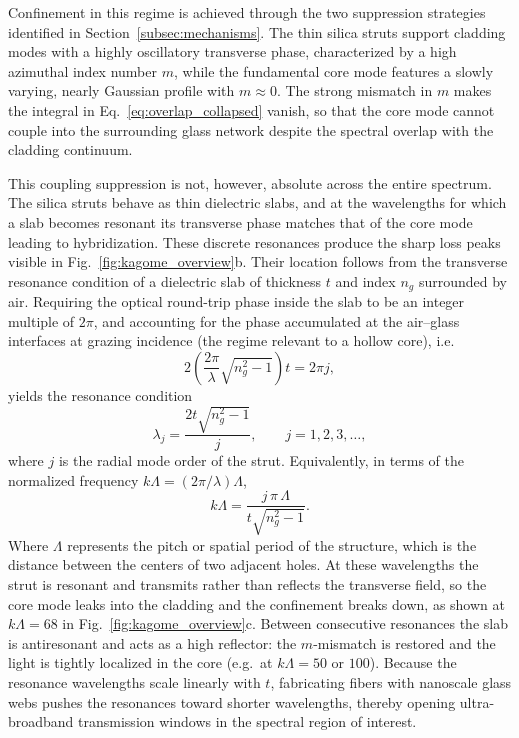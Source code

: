 Confinement in this regime is achieved through the two suppression strategies identified in Section~\ref{subsec:mechanisms}. The thin silica struts support cladding modes with a highly oscillatory transverse phase, characterized by a high azimuthal index number $m$, while the fundamental core mode features a slowly varying, nearly Gaussian profile with $m \approx 0$. The strong mismatch in $m$ makes the integral in Eq.~\ref{eq:overlap_collapsed} vanish, so that the core mode cannot couple into the surrounding glass network despite the spectral overlap with the cladding continuum.

This coupling suppression is not, however, absolute across the entire spectrum. The silica struts behave as thin dielectric slabs, and at the wavelengths for which a slab becomes resonant its transverse phase matches that of the core mode leading to hybridization. These discrete resonances produce the sharp loss peaks visible in Fig.~\ref{fig:kagome_overview}b. Their location follows from the transverse resonance condition of a dielectric slab of thickness $t$ and index $n_g$ surrounded by air. Requiring the optical round-trip phase inside the slab to be an integer multiple of $2\pi$, and accounting for the phase accumulated at the air--glass interfaces at grazing incidence (the regime relevant to a hollow core), i.e.
\begin{equation}
2\left(\frac{2\pi}{\lambda}\sqrt{n_g^2-1}\right)t = 2\pi j,
\end{equation}
yields the resonance condition~\cite{Debord2019}
\begin{equation}
\lambda_j = \frac{2t\sqrt{n_g^2 - 1}}{j}, \qquad j = 1, 2, 3, \dots,
\label{eq:antiresonance}
\end{equation}
where $j$ is the radial mode order of the strut. Equivalently, in terms of the normalized frequency $k\Lambda = (2\pi/\lambda)\Lambda$,
\begin{equation}
k\Lambda = \frac{j\,\pi\,\Lambda}{t\sqrt{n_g^2 - 1}}.
\label{eq:antiresonance_kL}
\end{equation}
Where $\Lambda$ represents the pitch or spatial period of the structure, which is the distance between the centers of two adjacent holes. At these wavelengths the strut is resonant and transmits rather than reflects the transverse field, so the core mode leaks into the cladding and the confinement breaks down, as shown at $k\Lambda = 68$ in Fig.~\ref{fig:kagome_overview}c. Between consecutive resonances the slab is antiresonant and acts as a high reflector: the $m$-mismatch is restored and the light is tightly localized in the core (e.g.\ at $k\Lambda = 50$ or $100$). Because the resonance wavelengths scale linearly with $t$, fabricating fibers with nanoscale glass webs pushes the resonances toward shorter wavelengths, thereby opening ultra-broadband transmission windows in the spectral region of interest.

